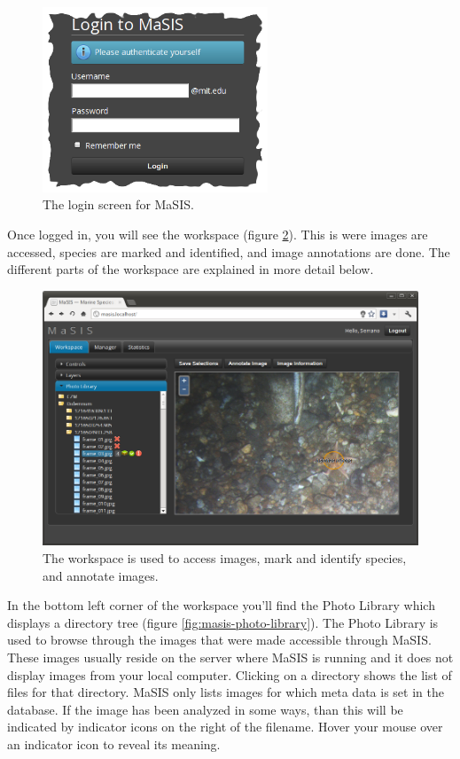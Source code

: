 \documentclass[twoside,a4paper]{refart}
\begin{document}
\begin{figure}[hbtp]
\centering
\includegraphics[width=0.6\textwidth]{screenshots/masis-login}
\caption{The login screen for MaSIS.}
\label{fig:masis-login}
\end{figure}

Once logged in, you will see the workspace (figure \ref{fig:masis-workspace}). This is were images are accessed, species are marked and identified, and image annotations are done. The different parts of the workspace are explained in more detail below.

\begin{figure}[hbtp]
\centering
\includegraphics[width=\textwidth]{screenshots/masis-workspace}
\caption{The workspace is used to access images, mark and identify species, and annotate images.}
\label{fig:masis-workspace}
\end{figure}

In the bottom left corner of the workspace you'll find the Photo Library which displays a directory tree (figure \ref{fig:masis-photo-library}). The Photo Library is used to browse through the images that were made accessible through MaSIS. These images usually reside on the server where MaSIS is running and it does not display images from your local computer. Clicking on a directory shows the list of files for that directory. MaSIS only lists images for which meta data is set in the database. If the image has been analyzed in some ways, than this will be indicated by indicator icons on the right of the filename. Hover your mouse over an indicator icon to reveal its meaning.
\end{document}

